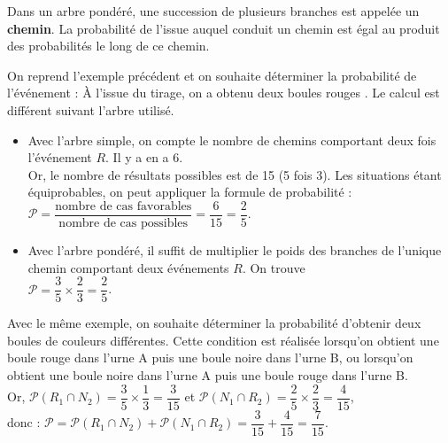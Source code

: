 \bigskip

\begin{propriete}
   Dans un arbre pondéré, une succession de plusieurs branches est appelée un \textbf{chemin}. La probabilité de l'issue auquel conduit un chemin est égal au produit des probabilités le long de ce chemin.
\end{propriete}

\begin{exemple}[0.3]
   On reprend l'exemple précédent et on souhaite déterminer la probabilité de l'événement : \og À l'issue du tirage, on a obtenu deux boules rouges \fg{}.
\correction
   Le calcul est différent suivant l'arbre utilisé.
   \begin{itemize}
      \item Avec l'arbre simple, on compte le nombre de chemins comportant deux fois l'événement $R$. Il y a en a 6. \\
      Or, le nombre de résultats possibles est de 15 (5 fois 3). Les situations étant équiprobables, on peut appliquer la formule de probabilité : \\ [1mm]      
      $\mathcal{P} =\dfrac{\textrm{nombre de cas favorables}}{\textrm{nombre de cas possibles}} =\dfrac{6}{15} =\dfrac25$.
      \smallskip
      \item Avec l'arbre pondéré, il suffit de multiplier le poids des branches de l'unique chemin comportant deux événements $R$. On trouve \\ [1mm]
      $\mathcal{P} =\dfrac35\times\dfrac23 =\dfrac25$.
   \end{itemize}
\end{exemple}

\bigskip

\begin{exemple}[0.3]
   Avec le même exemple, on souhaite déterminer la probabilité d'obtenir deux boules de couleurs différentes.
\correction
   Cette condition est réalisée lorsqu'on obtient une boule rouge dans l'urne A puis une boule noire dans l'urne B, ou lorsqu'on obtient une boule noire dans l'urne A puis une boule rouge dans l'urne B. \\ 
      Or, $\mathcal{P}(R_1\cap N_2) =\dfrac35\times\dfrac13 =\dfrac{3}{15}$ et $\mathcal{P}(N_1\cap R_2) =\dfrac25\times\dfrac23 =\dfrac{4}{15}$, \\ [5pt] 
      donc : $\mathcal{P} =\mathcal{P}(R_1\cap N_2)+\mathcal{P}(N_1\cap R_2) =\dfrac{3}{15}+\dfrac{4}{15} =\dfrac{7}{15}$. 
\end{exemple}


